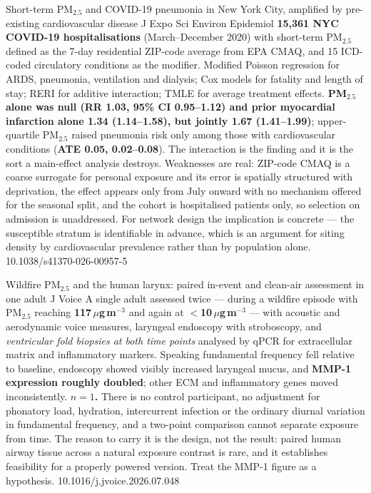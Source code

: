 \documentclass[10pt]{article}
\begin{document}

{Short-term PM$_{2.5}$ and COVID-19 pneumonia in New York City, amplified by pre-existing cardiovascular disease}
{J Expo Sci Environ Epidemiol}
{\textbf{15{,}361 NYC COVID-19 hospitalisations} (March--December 2020) with short-term
PM$_{2.5}$ defined as the 7-day residential ZIP-code average from EPA CMAQ, and 15
ICD-coded circulatory conditions as the modifier. Modified Poisson regression for ARDS,
pneumonia, ventilation and dialysis; Cox models for fatality and length of stay; RERI for
additive interaction; TMLE for average treatment effects. \textbf{PM$_{2.5}$ alone was null
(RR 1.03, 95\% CI 0.95--1.12) and prior myocardial infarction alone 1.34 (1.14--1.58), but
jointly 1.67 (1.41--1.99)}; upper-quartile PM$_{2.5}$ raised pneumonia risk only among
those with cardiovascular conditions (\textbf{ATE 0.05, 0.02--0.08}). The interaction is
the finding and it is the sort a main-effect analysis destroys. Weaknesses are real:
ZIP-code CMAQ is a coarse surrogate for personal exposure and its error is spatially
structured with deprivation, the effect appears only from July onward with no mechanism
offered for the seasonal split, and the cohort is hospitalised patients only, so selection
on admission is unaddressed. For network design the implication is concrete --- the
susceptible stratum is identifiable in advance, which is an argument for siting density by
cardiovascular prevalence rather than by population alone.}
{10.1038/s41370-026-00957-5}

{Wildfire PM$_{2.5}$ and the human larynx: paired in-event and clean-air assessment in one adult}
{J Voice}
{A single adult assessed twice --- during a wildfire episode with PM$_{2.5}$ reaching
\textbf{117\,$\mu$g\,m$^{-3}$} and again at \textbf{$<$10\,$\mu$g\,m$^{-3}$} --- with
acoustic and aerodynamic voice measures, laryngeal endoscopy with stroboscopy, and
\emph{ventricular fold biopsies at both time points} analysed by qPCR for extracellular
matrix and inflammatory markers. Speaking fundamental frequency fell relative to baseline,
endoscopy showed visibly increased laryngeal mucus, and \textbf{MMP-1 expression roughly
doubled}; other ECM and inflammatory genes moved inconsistently. \textbf{$n = 1$.} There is
no control participant, no adjustment for phonatory load, hydration, intercurrent
infection or the ordinary diurnal variation in fundamental frequency, and a two-point
comparison cannot separate exposure from time. The reason to carry it is the design, not
the result: paired human airway tissue across a natural exposure contrast is rare, and it
establishes feasibility for a properly powered version. Treat the MMP-1 figure as a
hypothesis.}
{10.1016/j.jvoice.2026.07.048}
\end{document}
